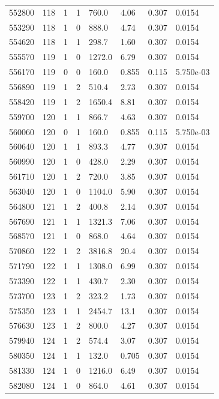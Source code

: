 \documentclass[preview]{standalone}
\begin{document}
{{{{{{{{{{{{{{\begin{tabular}{L{1.2cm}C{1.2cm} C{0.3cm}C{0.5cm} C{1.4cm}C{1.4cm} C{1.4cm}C{1.4cm}}
  552800  &   118  & 1     &  1 &  760.0  & 4.06  & 0.307 &  0.0154   \\ 
  553290  &   118  & 1     &  0 &  888.0  & 4.74  & 0.307 &  0.0154   \\ 
  554620  &   118  & 1     &  1 &  298.7  & 1.60  & 0.307 &  0.0154   \\ 
  555570  &   119  & 1     &  0 &  1272.0  & 6.79  & 0.307 &  0.0154   \\ 
  556170  &   119  & 0     &  0 &  160.0  & 0.855  & 0.115 &  5.750e-03   \\ 
  556890  &   119  & 1     &  2 &  510.4  & 2.73  & 0.307 &  0.0154   \\ 
  558420  &   119  & 1     &  2 &  1650.4  & 8.81  & 0.307 &  0.0154   \\ 
  559700  &   120  & 1     &  1 &  866.7  & 4.63  & 0.307 &  0.0154   \\ 
  560060  &   120  & 0     &  1 &  160.0  & 0.855  & 0.115 &  5.750e-03   \\ 
  560640  &   120  & 1     &  1 &  893.3  & 4.77  & 0.307 &  0.0154   \\ 
  560990  &   120  & 1     &  0 &  428.0  & 2.29  & 0.307 &  0.0154   \\ 
  561710  &   120  & 1     &  2 &  720.0  & 3.85  & 0.307 &  0.0154   \\ 
  563040  &   120  & 1     &  0 &  1104.0  & 5.90  & 0.307 &  0.0154   \\ 
  564800  &   121  & 1     &  2 &  400.8  & 2.14  & 0.307 &  0.0154   \\ 
  567690  &   121  & 1     &  1 &  1321.3  & 7.06  & 0.307 &  0.0154   \\ 
  568570  &   121  & 1     &  0 &  868.0  & 4.64  & 0.307 &  0.0154   \\ 
  570860  &   122  & 1     &  2 &  3816.8  & 20.4  & 0.307 &  0.0154   \\ 
  571790  &   122  & 1     &  1 &  1308.0  & 6.99  & 0.307 &  0.0154   \\ 
  573390  &   122  & 1     &  1 &  430.7  & 2.30  & 0.307 &  0.0154   \\ 
  573700  &   123  & 1     &  2 &  323.2  & 1.73  & 0.307 &  0.0154   \\ 
  575350  &   123  & 1     &  1 &  2454.7  & 13.1  & 0.307 &  0.0154   \\ 
  576630  &   123  & 1     &  2 &  800.0  & 4.27  & 0.307 &  0.0154   \\ 
  579940  &   124  & 1     &  2 &  574.4  & 3.07  & 0.307 &  0.0154   \\ 
  580350  &   124  & 1     &  1 &  132.0  & 0.705  & 0.307 &  0.0154   \\ 
  581330  &   124  & 1     &  0 &  1216.0  & 6.49  & 0.307 &  0.0154   \\ 
  582080  &   124  & 1     &  0 &  864.0  & 4.61  & 0.307 &  0.0154   \\ 
\hline 
\end{tabular} 

}}}}}}}}}}}}}}
\end{document}
